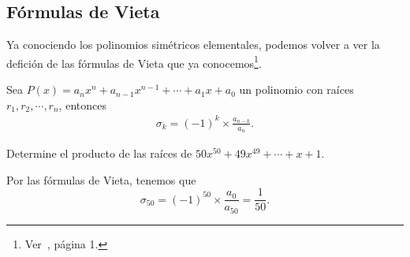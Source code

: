 \subsection{Fórmulas de Vieta}

Ya conociendo los polinomios simétricos elementales, podemos volver a ver la defición de las fórmulas de Vieta que ya conocemos\footnote{Ver~\cite{TD23-clase4}, página 1.}.

\begin{definition}
    Sea $P(x) = a_n x^n + a_{n - 1} x^{n - 1} + \cdots  + a_1 x + a_0$ un polinomio con raíces $r_1, r_2, \cdots, r_n$,
    entonces
    \begin{gather*}
        \sigma_k = (-1)^k\times \frac{a_{n - k}}{a_n}.
    \end{gather*}
\end{definition}

\begin{example}
    Determine el producto de las raíces de $50x^{50} + 49x^{49} + \cdots + x + 1.$
\end{example}
\begin{solution}
    Por las fórmulas de Vieta, tenemos que
    \[\sigma_{50} = (-1)^{50} \times \frac{a_0}{a_{50}} = \boxed{\frac{1}{50}}. \]
\end{solution}

